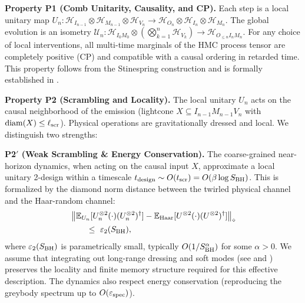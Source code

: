 \documentclass[a4paper,11pt]{article}
\newcommand{\HMC}{\textup{\textsc{HMC}}\xspace}
\theoremstyle{plain}
\theoremstyle{definition}
\theoremstyle{remark}
\begin{document}
\textbf{Property P1 (Comb Unitarity, Causality, and CP).}
Each step is a local unitary map $U_n: \mathcal{H}_{I_{n-1}}\otimes \mathcal{H}_{M_{n-1}}\otimes \mathcal{H}_{V_n} \to \mathcal{H}_{O_n} \otimes \mathcal{H}_{I_n}\otimes \mathcal{H}_{M_n}$. The global evolution is an isometry $\mathcal{U}_n: \mathcal{H}_{I_0 M_0} \otimes (\bigotimes_{k=1}^n \mathcal{H}_{V_k}) \to \mathcal{H}_{O_{\le n} I_n M_n}$. For any choice of local interventions, all multi-time marginals of the \HMC{} process tensor are completely positive (CP) and compatible with a causal ordering in retarded time.
This property follows from the Stinespring construction and is formally established in .


\textbf{Property P2 (Scrambling and Locality).}
The local unitary $U_n$ acts on the causal neighborhood of the emission (lightcone $X\subseteq I_{n-1}M_{n-1}V_n$ with ${\rm diam}(X)\le \ell_{\rm scr}$). Physical operations are gravitationally dressed and local. We distinguish two strengths:

\textbf{P2$'$ (Weak Scrambling \& Energy Conservation).} The coarse-grained near-horizon dynamics, when acting on the causal input $X$, approximate a local unitary 2-design within a timescale $t_{\rm design} \sim O(t_{\rm scr}) = O(\beta \log S_{\rm BH})$. This is formalized by the diamond norm distance between the twirled physical channel and the Haar-random channel:
\begin{equation}
\begin{split}
&\left\| \mathbb{E}_{U_n}[U_n^{\otimes 2} (\cdot) (U_n^{\otimes 2})^\dagger] - \mathbb{E}_{\rm Haar}[U^{\otimes 2} (\cdot) (U^{\otimes 2})^\dagger]\right\|_\diamond \\
&\qquad \le\ \varepsilon_2(S_{\rm BH}),
\end{split}
\end{equation}
where $\varepsilon_2(S_{\rm BH})$ is parametrically small, typically $O(1/S_{\rm BH}^\alpha)$ for some $\alpha>0$. We assume that integrating out long-range dressing and soft modes (see  and ) preserves the locality and finite memory structure required for this effective description. The dynamics also respect energy conservation (reproducing the greybody spectrum up to $O(\varepsilon_{\rm spec})$).
\end{document}
